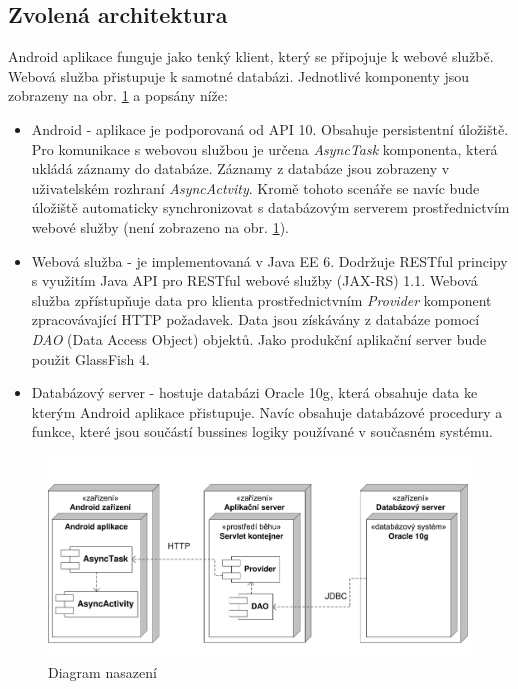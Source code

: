 \documentclass{diplomka}
\begin{document}
\subsection{Zvolená architektura}
Android aplikace funguje jako tenký klient, který se připojuje k webové službě. Webová služba přistupuje k samotné databázi. Jednotlivé komponenty jsou zobrazeny na obr. \ref{fig:deployment} a popsány níže:
\begin{itemize}
\item Android - aplikace je podporovaná od API 10. Obsahuje persistentní úložiště. Pro komunikace s webovou službou je určena \emph{AsyncTask} komponenta, která ukládá záznamy do databáze. Záznamy z databáze jsou zobrazeny v uživatelském rozhraní \emph{AsyncActvity}. Kromě tohoto scenáře se navíc bude úložiště automaticky synchronizovat s databázovým serverem prostřednictvím webové služby (není zobrazeno na obr. \ref{fig:deployment}).
\item Webová služba - je implementovaná v Java EE 6. Dodržuje RESTful principy s využitím Java API pro RESTful webové služby (JAX-RS) 1.1. Webová služba zpřístupňuje data pro klienta prostřednictvním \emph{Provider} komponent zpracovávající HTTP požadavek. Data jsou získávány z databáze pomocí \emph{DAO} (Data Access Object) objektů. Jako produkční aplikační server bude použit GlassFish 4.
\item Databázový server - hostuje databázi Oracle 10g, která obsahuje data ke kterým Android aplikace přistupuje. Navíc obsahuje databázové procedury a funkce, které jsou součástí bussines logiky používané v současném systému.
\end{itemize}
\begin{figure}[H]
  \centering
  \includegraphics[scale=0.7]{visio/deployment.pdf}
\caption{Diagram nasazení}
\label{fig:deployment}
\end{figure}
\end{document}
